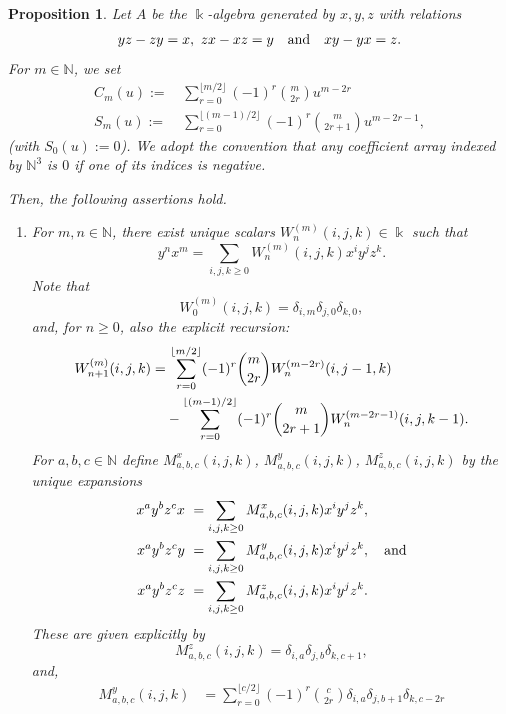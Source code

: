 \documentclass{amsart}
\newtheorem{proposition}[theorem]{Proposition}
\theoremstyle{definition}
\theoremstyle{remark}
\numberwithin{equation}{section}
\begin{document}
\begin{proposition}\label{Case(5)(i)}
Let $A$ be the $\Bbbk$-algebra generated by $x,y,z$ with relations
\[
yz - zy = x,\ zx - xz = y \quad {\rm and} \quad xy - yx = z.
\]
For $m\in\mathbb N$, we set
\begin{align}\label{CScase5i}
C_m(u) := &\, \sum_{r=0}^{\lfloor m/2\rfloor}(-1)^r\binom{m}{2r}u^{m-2r} \\
S_m(u) := &\, \sum_{r=0}^{\lfloor (m-1)/2\rfloor}(-1)^r\binom{m}{2r+1}u^{m-2r-1},
\end{align}
{\rm(}with $S_0(u):=0${\rm )}. We adopt the convention that any coefficient array indexed by $\mathbb N^3$ is $0$ if one of its indices is negative.

Then, the following assertions hold.
\begin{enumerate}
\item[\rm (1)] For $m,n\in\mathbb N$, there exist unique scalars $W^{(m)}_{n}(i,j,k)\in\Bbbk$ such that
\begin{equation}\label{Wdefynxmcase5i}
y^n x^m=\sum_{i,j,k\ge 0}W^{(m)}_{n}(i,j,k)x^i y^j z^k.
\end{equation}
Note that
\[
W^{(m)}_{0}(i,j,k)=\delta_{i,m}\delta_{j,0}\delta_{k,0},
\]
and, for $n\ge 0$, also the explicit recursion:
\begin{align}
W^{(m)}_{n+1}(i,j,k) = &\, \sum_{r=0}^{\lfloor m/2\rfloor}(-1)^r\binom{m}{2r}W^{(m-2r)}_{n}(i,j-1,k) \label{Wrecynxmcase5i} \\
& -\sum_{r=0}^{\lfloor (m-1)/2\rfloor}(-1)^r\binom{m}{2r+1}W^{(m-2r-1)}_{n}(i,j,k-1). \notag
\end{align}
For $a,b,c\in\mathbb N$ define $M^x_{a,b,c}(i,j,k)$, $M^y_{a,b,c}(i,j,k)$, $M^z_{a,b,c}(i,j,k)$ by the unique expansions
\begin{align*}
x^a y^b z^cx &\ =\sum_{i,j,k\ge 0}M^x_{a,b,c}(i,j,k) x^i y^j z^k,\\
x^a y^b z^cy &\ =\sum_{i,j,k\ge 0}M^y_{a,b,c}(i,j,k) x^i y^j z^k, \quad {\rm and} \\
x^a y^b z^cz &\ =\sum_{i,j,k\ge 0}M^z_{a,b,c}(i,j,k) x^i y^j z^k.
\end{align*}
These are given explicitly by
\begin{equation}\label{Mzkernelcase5i}
M^{z}_{a,b,c}(i,j,k)=\delta_{i,a}\delta_{j,b}\delta_{k,c+1},
\end{equation}
and, 
\begin{equation}\label{Mykernelcase5i}
\begin{aligned}
M^{y}_{a,b,c}(i,j,k)
&=\sum_{r=0}^{\lfloor c/2\rfloor}(-1)^r\binom{c}{2r}\delta_{i,a}\delta_{j,b+1}\delta_{k,c-2r}\\

\end{aligned}
\end{equation}
\end{enumerate}
\end{proposition}
\end{document}
